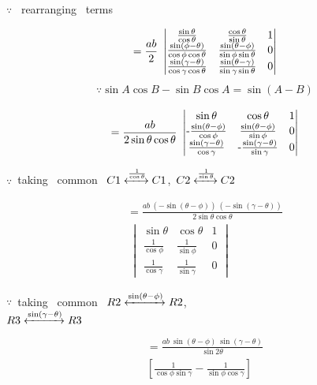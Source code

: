 \documentclass[journal,12pt,twocolumn]{IEEEtran}
\begin{document}
$\because$ ~rearranging ~terms 


\begin{multline}
=\frac{ab}{2}~\begin{vmatrix}
 \frac{\sin\theta}{\cos\theta} & \frac{\cos\theta}{\sin\theta} & 1  \\ 
 \frac{\sin(\phi-\theta)}{\cos\phi\cos\theta} & \frac{\sin(\theta-\phi)}{\sin\phi\sin\theta} & 0  \\
 \frac{\sin(\gamma-\theta)}{\cos\gamma\cos\theta} & \frac{\sin(\theta-\gamma)}{\sin\gamma\sin\theta} & 0 
\end{vmatrix}    
\end{multline}
\begin{align*}
\because \sin A\cos B - \sin B\cos A = \sin(A-B)
\end{align*}

\begin{multline}
=\frac{ab}{2 \sin\theta\cos\theta}~\mydet{
 {\sin\theta} & {\cos\theta} & 1  \\ $-$
 \frac{\sin(\theta-\phi)}{\cos\phi} & \frac{\sin(\theta-\phi)}{\sin\phi} & 0  \\
 \frac{\sin(\gamma-\theta)}{\cos\gamma} &$-$ \frac{\sin(\gamma-\theta)}{\sin\gamma} & 0 
}
\end{multline}

$\because$~taking~ common ~$ C1 \xleftrightarrow{{\frac{1}{\cos\theta}}} C1$,~$C2 \xleftrightarrow{{\frac{1}{\sin\theta}}} C2$

\begin{multline}
=\frac{ab~(-\sin(\theta-\phi))~(-\sin(\gamma-\theta))}{2 \sin\theta\cos\theta}\\~\begin{vmatrix}
 {\sin\theta} & {\cos\theta} & 1  \\ 
 \frac{1}{\cos\phi} & \frac{1}{\sin\phi} & 0  \\
 \frac{1}{\cos\gamma} & \frac{1}{\sin\gamma} & 0 
\end{vmatrix}    
\end{multline}

$\because$~taking~ common ~$ R2 \xleftrightarrow{{\sin(\theta-\phi)}} R2$,\\$R3 \xleftrightarrow{{\sin(\gamma-\theta)}} R3$



\begin{multline}
=\frac{ab~\sin(\theta-\phi)~\sin(\gamma-\theta)}{ \sin2\theta}\\\left[\frac{1}{\cos\phi\sin\gamma}-\frac{1}{\sin\phi\cos\gamma}
\right]
\end{multline}
\end{document}
